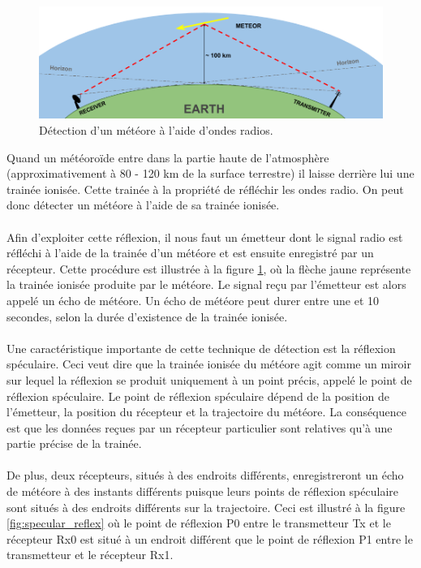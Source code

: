 \documentclass[11pt]{article}
\begin{document}
\begin{figure}[t]
    \begin{center}
        \includegraphics[scale=0.37]{ForwardScatter_principle.png}
        \caption{Détection d'un météore à l'aide d'ondes radios.}
        \label{fig:forward_scatt}
    \end{center}
\end{figure}

Quand un météoroïde entre dans la partie haute de l'atmosphère (approximativement à 80 - 120 km de la surface terrestre) il laisse derrière lui une trainée ionisée.
Cette trainée à la propriété de réfléchir les ondes radio.
On peut donc détecter un météore à l'aide de sa trainée ionisée.
\\
\\
Afin d'exploiter cette réflexion, il nous faut un émetteur dont le signal radio est réfléchi à l'aide de la trainée d'un météore et est ensuite enregistré par un récepteur.
Cette procédure est illustrée à la figure \ref{fig:forward_scatt}, où la flèche jaune représente la trainée ionisée produite par le météore.
Le signal reçu par l'émetteur est alors appelé un écho de météore.
Un écho de météore peut durer entre une et 10 secondes, selon la durée d'existence de la trainée ionisée.
\\
\\
Une caractéristique importante de cette technique de détection est la réflexion spéculaire.
Ceci veut dire que la trainée ionisée du météore agit comme un miroir sur lequel la réflexion se produit uniquement à un point précis, appelé le point de réflexion spéculaire.
Le point de réflexion spéculaire dépend de la position de l'émetteur, la position du récepteur et la trajectoire du météore.
La conséquence est que les données reçues par un récepteur particulier sont relatives qu'à une partie précise de la trainée.
\\
\\
De plus, deux récepteurs, situés à des endroits différents, enregistreront un écho de météore à des instants différents puisque leurs points de réflexion spéculaire sont situés à des endroits différents sur la trajectoire.
Ceci est illustré à la figure \ref{fig:specular_reflex} où le point de réflexion P0 entre le transmetteur Tx et le récepteur Rx0 est situé à un endroit différent que le point de réflexion P1 entre le transmetteur et le récepteur Rx1.
\end{document}
